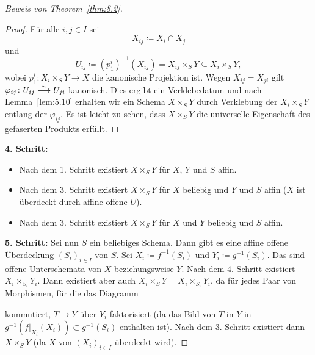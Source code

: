 \begin{proof}[Beweis von Theorem~\ref{thm:8.2}]
	\begin{proof}
		Für alle $i,j \in I$ sei
		\[
			X_{ij} \coloneqq X_i \cap X_j
		\]
		und
		\[
			U_{ij} \coloneqq (p^i_1)^{-1}(X_{ij}) = X_{ij}\times_S Y \subseteq X_i \times_S Y,
		\]
		wobei $p^i_1 \colon X_i \times_S Y \to X$ die kanonische Projektion ist. Wegen $X_{ij} = X_{ji}$ gilt $\varphi_{ij}\colon U_{ij} \overset{\sim}{\longrightarrow} U_{ji}$ kanonisch. Dies ergibt ein Verklebedatum und nach Lemma~\ref{lem:5.10} erhalten wir ein Schema $X\times_S Y$ durch Verklebung der $X_i\times_S Y$ entlang der $\varphi_{ij}$. Es ist leicht zu sehen, dass $X \times_S Y$ die universelle Eigenschaft des gefaserten Produkts erfüllt.
	\end{proof}
	\textbf{4. Schritt:}
	\begin{itemize}
		\item Nach dem 1. Schritt existiert $X \times_S Y$ für $X$, $Y$ und $S$ affin.
		\item Nach dem 3. Schritt existiert $X \times_S Y$ für $X$ beliebig und $Y$ und $S$ affin ($X$ ist überdeckt durch affine offene $U$).
		\item Nach dem 3. Schritt existiert $X \times_S Y$ für $X$ und $Y$ beliebig und $S$ affin.
	\end{itemize}
	\textbf{5. Schritt:} Sei nun $S$ ein beliebiges Schema. Dann gibt es eine affine offene Überdeckung $(S_i)_{i \in I}$ von $S$. Sei $X_i \coloneqq f^{-1}(S_i)$ und $Y_i\coloneqq g^{-1}(S_i)$. Das sind offene Unterschemata von $X$ beziehungsweise $Y$. Nach dem 4. Schritt existiert $X_i \times_{S_i} Y_i$. Dann existiert aber auch $X_i\times_S Y = X_i \times_{S_i} Y_i$, da für jedes Paar von Morphismen, für die das Diagramm
	\begin{center}
	\end{center}
	kommutiert, $T\to Y$ über $Y_i$ faktorisiert (da das Bild von $T$ in $Y$ in $g^{-1}(f\vert_{X_i}(X_i)) \subset g^{-1}(S_i)$ enthalten ist). Nach dem 3. Schritt existiert dann $X\times_S Y$ (da $X$ von $(X_i)_{i \in I}$ überdeckt wird).
\end{proof}

